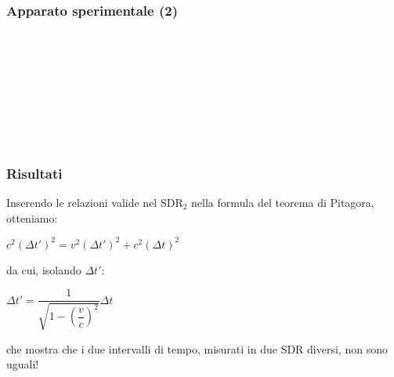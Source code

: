 \documentclass[]{beamer}
\theoremstyle{plain}
\begin{document}
\begin{frame}
  \frametitle{Apparato sperimentale (2)}
\begin{columns}
\begin{column}{0.4\textwidth}

~

~

\end{column}
\begin{column}{0.6\textwidth}
\begin{footnotesize}
~\\~\\~\\
~\\~\\~\\
\end{footnotesize}
\end{column}
\end{columns}
\end{frame}


\begin{frame}
  \frametitle{Risultati}
  Inserendo le relazioni valide nel SDR$ _2 $ nella formula del teorema di Pitagora, otteniamo:
  \begin{center}
  $ c^2 (\Delta t')^2 = v^2 (\Delta t')^2 + c^2 (\Delta t)^2 $
  \end{center}
  da cui, isolando $ \Delta t' $:\pause
  \begin{center}
  \colorbox{blue!30}{$ \Delta t' = \dfrac{1}{\sqrt{1- \left( \dfrac{v}{c} \right)^2 }}\Delta t $}
  \end{center}
  che mostra che i due intervalli di tempo, misurati in due SDR diversi, non sono uguali!
\end{frame}
\end{document}
